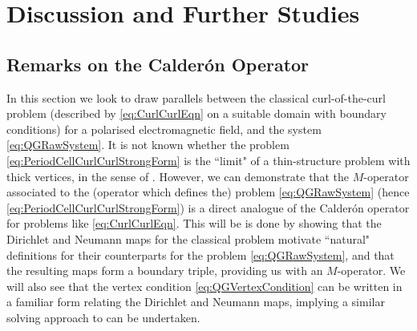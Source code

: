 \section{Discussion and Further Studies} \label{sec:CC-Discussion}


\subsection{Remarks on the Calder\'on Operator} \label{ssec:CalderonOp}
In this section we look to draw parallels between the classical curl-of-the-curl problem (described by \eqref{eq:CurlCurlEqn} on a suitable domain with boundary conditions) for a polarised electromagnetic field, and the system \eqref{eq:QGRawSystem}.
It is not known whether the problem \eqref{eq:PeriodCellCurlCurlStrongForm} is the ``limit" of a thin-structure problem with thick vertices, in the sense of .
However, we can demonstrate that the $M$-operator associated to the (operator which defines the) problem \eqref{eq:QGRawSystem} (hence \eqref{eq:PeriodCellCurlCurlStrongForm}) is a direct analogue of the Calder\'on operator for problems like \eqref{eq:CurlCurlEqn}.
This will be is done by showing that the Dirichlet and Neumann maps for the classical problem motivate ``natural" definitions for their counterparts for the problem \eqref{eq:QGRawSystem}, and that the resulting maps form a boundary triple, providing us with an $M$-operator.
We will also see that the vertex condition \eqref{eq:QGVertexCondition} can be written in a familiar form  relating the Dirichlet and Neumann maps, implying a similar solving approach to  can be undertaken.

